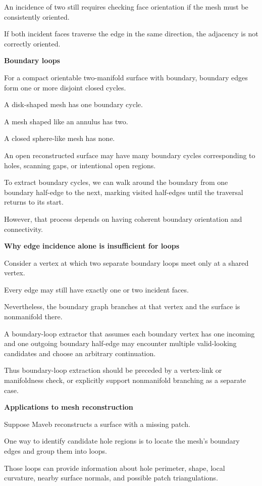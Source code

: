 An incidence of two still requires checking face orientation if the mesh must be consistently oriented.

If both incident faces traverse the edge in the same direction, the adjacency is not correctly oriented.

\textbf{Boundary loops}

For a compact orientable two-manifold surface with boundary, boundary edges form one or more disjoint closed cycles.

A disk-shaped mesh has one boundary cycle.

A mesh shaped like an annulus has two.

A closed sphere-like mesh has none.

An open reconstructed surface may have many boundary cycles corresponding to holes, scanning gaps, or intentional open regions.

To extract boundary cycles, we can walk around the boundary from one boundary half-edge to the next, marking visited half-edges until the traversal returns to its start.

However, that process depends on having coherent boundary orientation and connectivity.

\textbf{Why edge incidence alone is insufficient for loops}

Consider a vertex at which two separate boundary loops meet only at a shared vertex.

Every edge may still have exactly one or two incident faces.

Nevertheless, the boundary graph branches at that vertex and the surface is nonmanifold there.

A boundary-loop extractor that assumes each boundary vertex has one incoming and one outgoing boundary half-edge may encounter multiple valid-looking candidates and choose an arbitrary continuation.

Thus boundary-loop extraction should be preceded by a vertex-link or manifoldness check, or explicitly support nonmanifold branching as a separate case.

\textbf{Applications to mesh reconstruction}

Suppose Maveb reconstructs a surface with a missing patch.

One way to identify candidate hole regions is to locate the mesh's boundary edges and group them into loops.

Those loops can provide information about hole perimeter, shape, local curvature, nearby surface normals, and possible patch triangulations.

